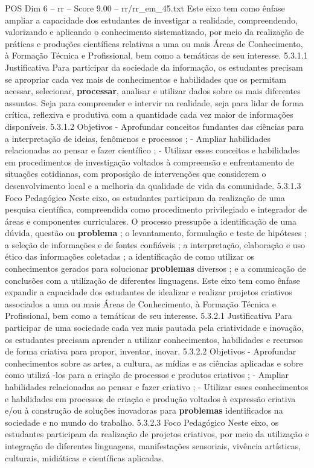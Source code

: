 \begin{textsample}{POS Dim 6 – rr – Score 9.00 – rr/rr\_em\_45.txt}  \label{ex:f6_pos_214}
Este eixo tem como ênfase ampliar a capacidade dos estudantes de investigar a realidade, compreendendo, valorizando e aplicando o conhecimento sistematizado, por meio da realização de práticas e produções científicas relativas a uma ou mais Áreas de Conhecimento, à Formação Técnica e Profissional, bem como a temáticas de seu interesse. 5.3.1.1 Justificativa Para participar da sociedade da informação, os estudantes precisam se apropriar cada vez mais de conhecimentos e habilidades que os permitam acessar, selecionar, \textbf{processar}, analisar e utilizar dados sobre os mais diferentes assuntos.
Seja para compreender e intervir na realidade, seja para lidar de forma crítica, reflexiva e produtiva com a quantidade cada vez maior de informações disponíveis. 5.3.1.2 Objetivos - Aprofundar conceitos fundantes das ciências para a interpretação de ideias, fenômenos e processos ; - Ampliar habilidades relacionadas ao pensar e fazer científico ; - Utilizar esses conceitos e habilidades em procedimentos de investigação voltados à compreensão e enfrentamento de situações cotidianas, com proposição de intervenções que considerem o desenvolvimento local e a melhoria da qualidade de vida da comunidade. 5.3.1.3 Foco Pedagógico Neste eixo, os estudantes participam da realização de uma pesquisa científica, compreendida como procedimento privilegiado e integrador de áreas e componentes curriculares.
O processo pressupõe a identificação de uma dúvida, questão ou \textbf{problema} ; o levantamento, formulação e teste de hipóteses ; a seleção de informações e de fontes confiáveis ; a interpretação, elaboração e uso ético das informações coletadas ; a identificação de como utilizar os conhecimentos gerados para solucionar \textbf{problemas} diversos ; e a comunicação de conclusões com a utilização de diferentes linguagens.
Este eixo tem como ênfase expandir a capacidade dos estudantes de idealizar e realizar projetos criativos associados a uma ou mais Áreas de Conhecimento, à Formação Técnica e Profissional, bem como a temáticas de seu interesse. 5.3.2.1 Justificativa Para participar de uma sociedade cada vez mais pautada pela criatividade e inovação, os estudantes precisam aprender a utilizar conhecimentos, habilidades e recursos de forma criativa para propor, inventar, inovar. 5.3.2.2 Objetivos - Aprofundar conhecimentos sobre as artes, a cultura, as mídias e as ciências aplicadas e sobre como utilizá -los para a criação de processos e produtos criativos ; - Ampliar habilidades relacionadas ao pensar e fazer criativo ; - Utilizar esses conhecimentos e habilidades em processos de criação e produção voltados à expressão criativa e/ou à construção de soluções inovadoras para \textbf{problemas} identificados na sociedade e no mundo do trabalho. 5.3.2.3 Foco Pedagógico Neste eixo, os estudantes participam da realização de projetos criativos, por meio da utilização e integração de diferentes linguagens, manifestações sensoriais, vivência artísticas, culturais, midiáticas e científicas aplicadas.

\end{textsample}
